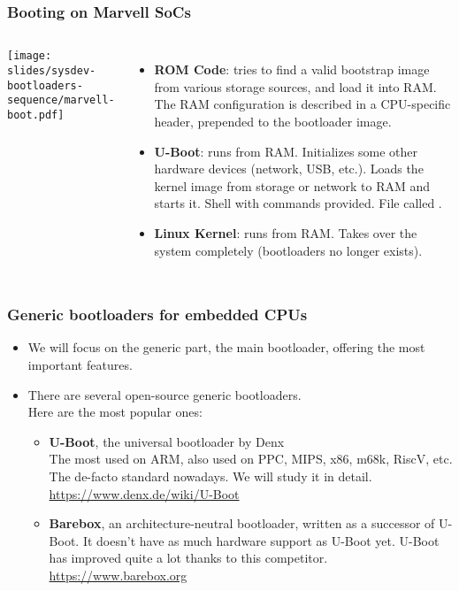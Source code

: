 

\begin{frame}
  \frametitle{Booting on Marvell SoCs}
  \begin{columns}
    \texttt{[image: slides/sysdev-bootloaders-sequence/marvell-boot.pdf]}
    \footnotesize
    \begin{itemize}
    \item {\bf ROM Code}: tries to find a valid bootstrap image from
      various storage sources, and load it into RAM. The RAM
      configuration is described in a CPU-specific header, prepended
      to the bootloader image.
    \item {\bf U-Boot}: runs from RAM. Initializes some other hardware
      devices (network, USB, etc.).  Loads the kernel image from
      storage or network to RAM and starts it. Shell with commands
      provided. File called .
    \item {\bf Linux Kernel}: runs from RAM. Takes over the system
      completely (bootloaders no longer exists).
    \end{itemize}
  \end{columns}
\end{frame}

\begin{frame}
  \frametitle{Generic bootloaders for embedded CPUs}
  \begin{itemize}
  \item We will focus on the generic part, the main bootloader, offering
    the most important features.
  \item There are several open-source generic bootloaders.\\
    Here are the most popular ones:
    \begin{itemize}
    \item {\bf U-Boot}, the universal bootloader by Denx\\
      The most used on ARM, also used on PPC, MIPS, x86, m68k, RiscV,
      etc. The de-facto standard nowadays. We will study it in detail.\\
      \url{https://www.denx.de/wiki/U-Boot}
    \item {\bf Barebox}, an architecture-neutral bootloader, written
      as a successor of U-Boot. It doesn't have as much hardware support
      as U-Boot yet. U-Boot has improved quite a lot thanks to this
      competitor.\\
      \url{https://www.barebox.org}
    \end{itemize}
  \end{itemize}
\end{frame}

